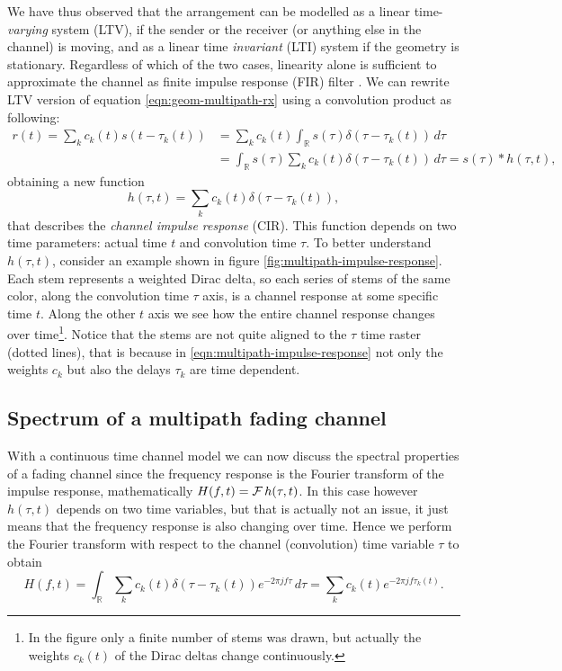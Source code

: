 We have thus observed that the arrangement can be modelled as a linear time-\emph{varying} system (LTV), if the sender or the receiver (or anything else in the channel) is moving, and as a linear time \emph{invariant} (LTI) system if the geometry is stationary. Regardless of which of the two cases, linearity alone is sufficient to approximate the channel as finite impulse response (FIR) filter \cite{Messier}. We can rewrite LTV version of equation \eqref{eqn:geom-multipath-rx} using a convolution product as following:
\begin{align*}
	r(t) = \sum_k c_k(t) s(t - \tau_k(t)) &= \sum_k c_k(t) \int_\mathbb{R} s(\tau) \delta(\tau - \tau_k(t)) \,d\tau \\
		&= \int_\mathbb{R} s(\tau) \sum_k c_k(t) \delta(\tau - \tau_k(t)) \,d\tau = s(\tau) * h(\tau, t),
\end{align*}
obtaining a new function
\begin{equation} \label{eqn:multipath-impulse-response}
	h(\tau, t) = \sum_k c_k(t) \delta(\tau - \tau_k(t)),
\end{equation}
that describes the \emph{channel impulse response} (CIR). This function depends on two time parameters: actual time \(t\) and convolution time \(\tau\). To better understand \(h(\tau, t)\), consider an example shown in figure \ref{fig:multipath-impulse-response}. Each stem represents a weighted Dirac delta, so each series of stems of the same color, along the convolution time \(\tau\) axis, is a channel response at some specific time \(t\). Along the other \(t\) axis we see how the entire channel response changes over time\footnote{In the figure only a finite number of stems was drawn, but actually the weights \(c_k(t)\) of the Dirac deltas change continuously.}. Notice that the stems are not quite aligned to the \(\tau\) time raster (dotted lines), that is because in \eqref{eqn:multipath-impulse-response} not only the weights \(c_k\) but also the delays \(\tau_k\) are time dependent.

\subsection{Spectrum of a multipath fading channel}

With a continuous time channel model we can now discuss the spectral properties of a fading channel since the frequency response is the Fourier transform of the impulse response, mathematically \(H(f, t) = \operatorname{\mathcal{F}} h(\tau, t)\). In this case however \(h(\tau, t)\) depends on two time variables, but that is actually not an issue, it just means that the frequency response is also changing over time. Hence we perform the Fourier transform with respect to the channel (convolution) time variable \(\tau\) to obtain
\begin{equation} \label{eqn:multipath-frequency-response}
	H(f, t) = \int_\mathbb{R} \sum_k c_k(t) \delta(\tau - \tau_k(t)) e^{-2\pi jf\tau} \, d\tau
	= \sum_k c_k(t) e^{-2\pi jf \tau_k(t)}.
\end{equation}

